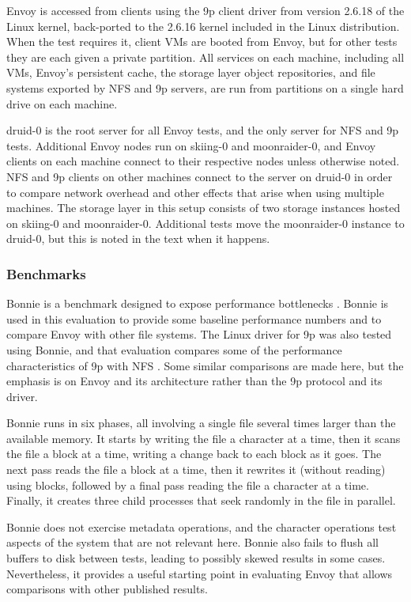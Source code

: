 Envoy is accessed from clients using the 9p client driver from version 2.6.18 of the Linux kernel, back-ported to the 2.6.16 kernel included in the Linux distribution. When the test requires it, client VMs are booted from Envoy, but for other tests they are each given a private partition. All services on each machine, including all VMs, Envoy's persistent cache, the storage layer object repositories, and file systems exported by NFS and 9p servers, are run from partitions on a single hard drive on each machine.

druid-0 is the root server for all Envoy tests, and the only server for NFS and 9p tests. Additional Envoy nodes run on skiing-0 and moonraider-0, and Envoy clients on each machine connect to their respective nodes unless otherwise noted. NFS and 9p clients on other machines connect to the server on druid-0 in order to compare network overhead and other effects that arise when using multiple machines. The storage layer in this setup consists of two storage instances hosted on skiing-0 and moonraider-0. Additional tests move the moonraider-0 instance to druid-0, but this is noted in the text when it happens.

\subsubsection{Benchmarks}

Bonnie is a benchmark designed to expose performance bottlenecks \cite{bray}. Bonnie is used in this evaluation to provide some baseline performance numbers and to compare Envoy with other file systems. The Linux driver for 9p was also tested using Bonnie, and that evaluation compares some of the performance characteristics of 9p with NFS \cite{hensbergen}. Some similar comparisons are made here, but the emphasis is on Envoy and its architecture rather than the 9p protocol and its driver.

Bonnie runs in six phases, all involving a single file several times larger than the available memory. It starts by writing the file a character at a time, then it scans the file a block at a time, writing a change back to each block as it goes. The next pass reads the file a block at a time, then it rewrites it (without reading) using blocks, followed by a final pass reading the file a character at a time. Finally, it creates three child processes that seek randomly in the file in parallel.

Bonnie does not exercise metadata operations, and the character operations test aspects of the system that are not relevant here. Bonnie also fails to flush all buffers to disk between tests, leading to possibly skewed results in some cases. Nevertheless, it provides a useful starting point in evaluating Envoy that allows comparisons with other published results.

